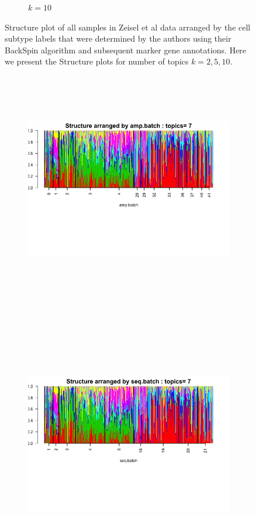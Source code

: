 \begin{figure}[ht]
\begin{subfigure}[t]{0.5\textwidth}
        \raggedright
        \vspace{-0.5in}  \qquad \qquad \caption{   $k=10$}
    \end{subfigure}    
    \caption{Structure plot of all  samples in Zeisel et al data \cite{Zeisel2015} arranged by the cell subtype labels that were determined by the authors using their BackSpin algorithm and subsequent marker gene annotations. Here we present the Structure plots for number of topics $k=2,5,10$. }
    \end{figure}


 \begin{figure}[ht]
    \raggedright
     \begin{subfigure}[t]{1\textwidth}
        \centering
        \includegraphics[height=4in]{../plots/Jaitin_struct_clus_7_amp_batch.png}
        \vspace{-1in} \qquad  \qquad  
    \end{subfigure}    \\
    \begin{subfigure}[t]{1\textwidth}
        \centering
        \includegraphics[height=4in]{../plots/Jaitin_struct_clus_7_seq_batch.png}

\end{subfigure}
\end{figure}

